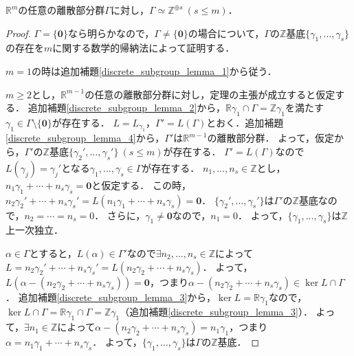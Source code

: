 \begin{screen}
  \begin{thm}
    \label{discrete_subgroup_theorem}
    $\mathbb{R}^m$の任意の離散部分群$\Gamma$に対し，$\Gamma\simeq\mathbb{Z}^{\oplus s}\ (s\leq m)．$
  \end{thm}
\end{screen}
\begin{proof}
  $\Gamma=\{\boldsymbol{0}\}$なら明らかなので，$\Gamma\neq\{\boldsymbol{0}\}$の場合について，$\Gamma$の$\mathbb{Z}$基底$\{\gamma_1,\ldots,\gamma_s\}$の存在を$m$に関する数学的帰納法によって証明する．

  $m=1$の時は追加補題\ref{discrete_subgroup_lemma_1}から従う．

  $m\geq2$とし，$\mathbb{R}^{m-1}$の任意の離散部分群に対し，定理の主張が成立すると仮定する．
  追加補題\ref{discrete_subgroup_lemma_2}から，$\mathbb{R}\gamma_1\cap\Gamma=\mathbb{Z}\gamma_1$を満たす$\gamma_1\in\Gamma\setminus\{\boldsymbol{0}\}$が存在する．
  $L=L_{\gamma_1}$，$\Gamma'=L(\Gamma)$とおく．追加補題\ref{discrete_subgroup_lemma_4}から，$\Gamma'$は$\mathbb{R}^{m-1}$の離散部分群．
  よって，仮定から，$\Gamma'$の$\mathbb{Z}$基底$\{\gamma_2',\ldots,\gamma_s'\}~ (s\leq m)$が存在する．
  $\Gamma'=L(\Gamma)$なので$L(\gamma_j)=\gamma_j'$となる$\gamma_1,\ldots,\gamma_s\in\Gamma$が存在する．
  $n_1,\ldots,n_s\in\mathbb{Z}$とし，$n_1\gamma_1+\cdots+n_s\gamma_s=\boldsymbol{0}$と仮定する．
  この時，$n_2\gamma_2'+\cdots+n_s\gamma_s'=L(n_1\gamma_1+\cdots+n_s\gamma_s)=\boldsymbol{0}$．
  $\{\gamma_2',\ldots,\gamma_s'\}$は$\Gamma'$の$\mathbb{Z}$基底なので，$n_2=\cdots=n_s=0$．
  さらに，$\gamma_1\neq\boldsymbol{0}$なので，$n_1=0$．
  よって，$\{\gamma_1,\ldots,\gamma_s\}$は$\mathbb{Z}$上一次独立．

  $\alpha\in\Gamma$とすると，$L(\alpha)\in\Gamma'$なので$\exists n_2,\ldots,n_s\in\mathbb{Z}$によって$L=n_2\gamma_2'+\cdots+n_s\gamma_s'=L(n_2\gamma_2+\cdots+n_s\gamma_s)$．
  よって，$L(\alpha-(n_2\gamma_2+\cdots+n_s\gamma_s))=\boldsymbol{0}$，つまり$\alpha-(n_2\gamma_2+\cdots+n_s\gamma_s)\in\ker L\cap\Gamma$．
  追加補題\ref{discrete_subgroup_lemma_3}から，$\ker L=\mathbb{R}\gamma_1$なので，$\ker L\cap\Gamma=\mathbb{R}\gamma_1\cap\Gamma=\mathbb{Z}\gamma_1$（追加補題\ref{discrete_subgroup_lemma_3}）．
  よって，$\exists n_1\in\mathbb{Z}$によって$\alpha-(n_2\gamma_2+\cdots+n_s\gamma_s)=n_1\gamma_1$，つまり$\alpha=n_1\gamma_1+\cdots+n_s\gamma_s$．
  よって，$\{\gamma_1,\ldots,\gamma_s\}$は$\Gamma$の$\mathbb{Z}$基底．
\end{proof}

